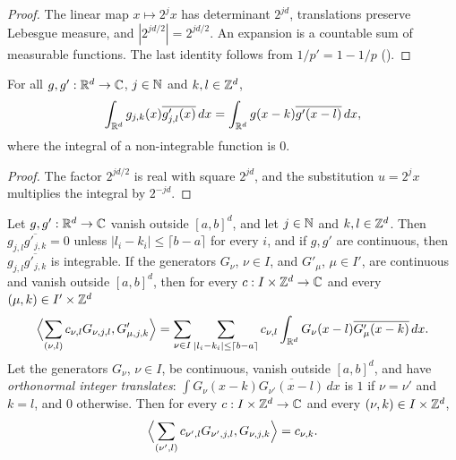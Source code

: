 \begin{proof}
\leanok
{}
The linear map $x \mapsto 2^j x$ has determinant $2^{jd}$, translations preserve Lebesgue
measure, and $|2^{jd/2}| = 2^{jd/2}$. An expansion is a countable sum of measurable functions.
The last identity follows from $1/p' = 1 - 1/p$ ().
\end{proof}

\begin{lemma}
\label{lem:daub-rd-orthonormal-levels}
\leanok
{}
For all $g, g' : \mathbb{R}^d \to \mathbb{C}$, $j \in \mathbb{N}$ and $k, l \in \mathbb{Z}^d$,
\[
  \int_{\mathbb{R}^d} g_{j,k}(x) \overline{g'_{j,l}(x)} \, dx
  = \int_{\mathbb{R}^d} g(x - k) \overline{g'(x - l)} \, dx ,
\]
where the integral of a non-integrable function is $0$.
\end{lemma}

\begin{proof}
\leanok
The factor $2^{jd/2}$ is real with square $2^{jd}$, and the substitution $u = 2^j x$ multiplies
the integral by $2^{-jd}$.
\end{proof}

\begin{proposition}
\label{prop:daub-rd-recovery}
\leanok
{}
Let $g, g' : \mathbb{R}^d \to \mathbb{C}$ vanish outside $[a, b]^d$, and let $j \in \mathbb{N}$ and $k, l \in \mathbb{Z}^d$. Then
$g_{j,l} \overline{g'_{j,k}} = 0$ unless $|l_i - k_i| \leq \lceil b - a \rceil$ for every $i$,
and if $g, g'$ are continuous, then $g_{j,l} \overline{g'_{j,k}}$ is integrable. If the
generators $G_\nu$, $\nu \in I$, and $G'_\mu$, $\mu \in I'$, are continuous and vanish outside
$[a, b]^d$, then for every $c : I \times \mathbb{Z}^d \to \mathbb{C}$ and every $(\mu, k) \in I' \times \mathbb{Z}^d$
\[
  \Bigl\langle \sum_{(\nu, l)} c_{\nu,l} G_{\nu,j,l}, G'_{\mu,j,k} \Bigr\rangle
  = \sum_{\nu \in I} \sum_{|l_i - k_i| \leq \lceil b - a \rceil}
    c_{\nu,l} \int_{\mathbb{R}^d} G_\nu(x - l) \overline{G'_\mu(x - k)} \, dx .
\]
Let the generators $G_\nu$, $\nu \in I$, be continuous, vanish outside $[a, b]^d$, and have
\emph{orthonormal integer translates}: $\int G_\nu(x - k) \overline{G_{\nu'}(x - l)} \, dx$ is
$1$ if $\nu = \nu'$ and $k = l$, and $0$ otherwise. Then for every $c : I \times \mathbb{Z}^d \to \mathbb{C}$
and every $(\nu, k) \in I \times \mathbb{Z}^d$,
\[
  \Bigl\langle \sum_{(\nu', l)} c_{\nu',l} G_{\nu',j,l}, G_{\nu,j,k} \Bigr\rangle = c_{\nu,k} .
\]
\end{proposition}

